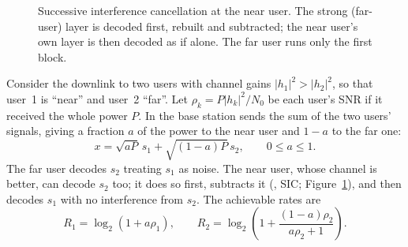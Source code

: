 \begin{figure}[htbp]\centering
{}
\caption{Successive interference cancellation at the near user. The strong (far-user) layer is decoded
first, rebuilt and subtracted; the near user's own layer is then decoded as if alone. The far user runs
only the first block.}
\label{fig:ch20_sic}
\end{figure}

Consider the downlink to two users with channel gains $|h_1|^2>|h_2|^2$, so that user~1 is ``near''
and user~2 ``far''. Let $\rho_k=P|h_k|^2/N_0$ be each user's SNR if it received the whole power $P$.
In  the base station sends the sum of the two users' signals, giving a
fraction $a$ of the power to the near user and $1-a$ to the far one:
\begin{equation}
x=\sqrt{aP}\,s_1+\sqrt{(1-a)P}\,s_2,\qquad 0\le a\le 1 .
\end{equation}
The far user decodes $s_2$ treating $s_1$ as noise. The near user, whose channel is better, can
decode $s_2$ too; it does so first, subtracts it (,
SIC; Figure~\ref{fig:ch20_sic}), and then decodes $s_1$ with no interference from $s_2$. The achievable rates are
\begin{equation}
R_1=\log_2(1+a\rho_1),\qquad
R_2=\log_2\!\left(1+\frac{(1-a)\rho_2}{a\rho_2+1}\right).
\label{eq:ch20:noma}
\end{equation}


